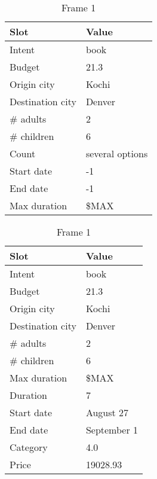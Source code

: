 \iffalse
\begin{table}
    \centering
    \begin{subtable}[t]{0.3\textwidth}
        \centering
        \begin{tabular}[t]{ll}
            \toprule
            Slot & Value \\
            \midrule
            Intent & book \\
            Budget & 21.3 \\
            Origin city & Kochi \\
            Destination city & Denver \\
            \# adults & 2 \\
            \# children & 6 \\
            Count & several options \\
            Start date & -1 \\
            End date & -1 \\
            Max duration & \$MAX \\
            \bottomrule
        \end{tabular}
        \caption{Frame 1}
    \end{subtable}
    \hspace{\fill}
    \begin{subtable}[t]{0.3\textwidth}
        \centering
        \begin{tabular}[t]{ll}
            \toprule
            Slot & Value \\
            \midrule
            Intent & book \\
            Budget & 21.3 \\
            Origin city & Kochi \\
            Destination city & Denver \\
            \# adults & 2 \\
            \# children & 6 \\
            Max duration & \$MAX \\
            Duration & 7 \\
            Start date & August 27 \\
            End date & September 1 \\
            Category & 4.0 \\
            Price & 19028.93 \\
            \bottomrule

\end{tabular}
\end{subtable}
\end{table}
